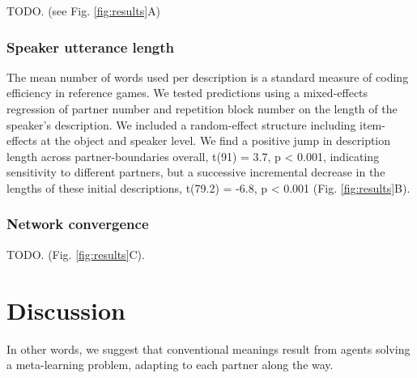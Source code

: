 \documentclass[10pt, letterpaper]{article}
\begin{document}
TODO. (see Fig. \ref{fig:results}A)

\hypertarget{speaker-utterance-length}{%
\subsubsection{Speaker utterance
length}\label{speaker-utterance-length}}

The mean number of words used per description is a standard measure of
coding efficiency in reference games. We tested predictions using a
mixed-effects regression of partner number and repetition block number
on the length of the speaker's description. We included a random-effect
structure including item-effects at the object and speaker level.
We find a positive jump in description length across partner-boundaries
overall, t(91) = 3.7, p \textless{} 0.001, indicating sensitivity to
different partners, but a successive incremental decrease in the lengths
of these initial descriptions, t(79.2) = -6.8, p \textless{} 0.001 (Fig.
\ref{fig:results}B). 

\hypertarget{network-convergence}{%
\subsubsection{Network convergence}\label{network-convergence}}

TODO. (Fig. \ref{fig:results}C).

\hypertarget{discussion}{%
\section{Discussion}\label{discussion}}

In other words, we suggest that conventional meanings result from agents
solving a meta-learning problem, adapting to each partner along the way.
\end{document}
